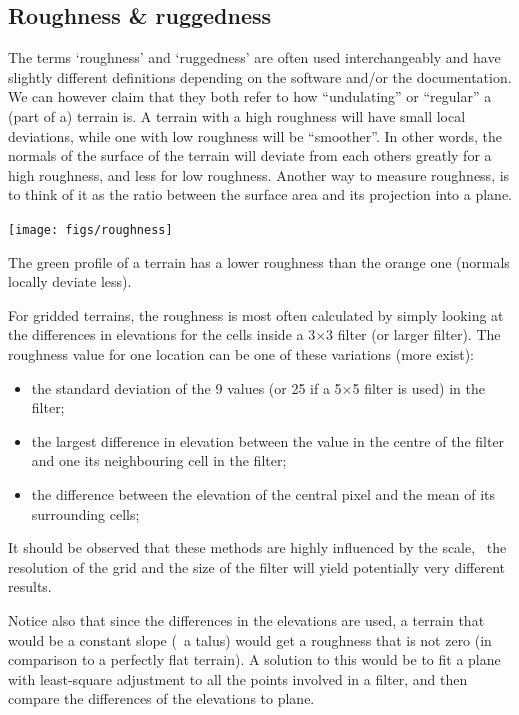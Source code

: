 %
\subsection{Roughness \& ruggedness}%

The terms `roughness' and `ruggedness' are often used interchangeably and have slightly different definitions depending on the software and/or the documentation.
We can however claim that they both refer to how ``undulating'' or ``regular'' a (part of a) terrain is.
A terrain with a high roughness will have small local deviations, while one with low roughness will be ``smoother''.
In other words, the normals of the surface of the terrain will deviate from each others greatly for a high roughness, and less for low roughness.
Another way to measure roughness, is to think of it as the ratio between the surface area and its projection into a plane. 
\begin{marginfigure}
  \centering
  \texttt{[image: figs/roughness]}
  \caption{The green profile of a terrain has a lower roughness than the orange one (normals locally deviate less).}%
\label{fig:roughness}
\end{marginfigure}

For gridded terrains, the roughness is most often calculated by simply looking at the differences in elevations for the cells inside a 3$\times$3 filter (or larger filter).
The roughness value for one location can be one of these variations (more exist):
\begin{itemize}
  \item the standard deviation of the 9 values (or 25 if a 5$\times$5 filter is used) in the filter;
  \item the largest difference in elevation between the value in the centre of the filter and one its neighbouring cell in the filter;
  \item the difference between the elevation of the central pixel and the mean of its surrounding cells;
\end{itemize}

It should be observed that these methods are highly influenced by the scale, \ie\ the resolution of the grid and the size of the filter will yield potentially very different results.

Notice also that since the differences in the elevations are used, a terrain that would be a constant slope (\eg\ a talus) would get a roughness that is not zero (in comparison to a perfectly flat terrain).
A solution to this would be to fit a plane with least-square adjustment to all the points involved in a filter, and then compare the differences of the elevations to plane.

